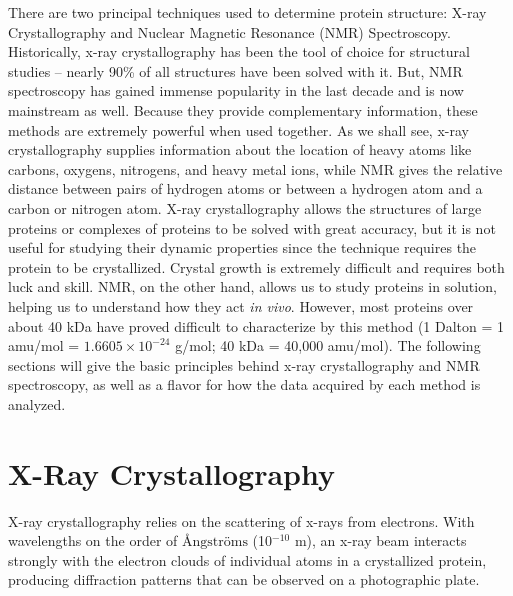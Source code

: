 There are two principal techniques used to determine protein structure: X-ray Crystallography and Nuclear Magnetic Resonance (NMR) Spectroscopy.  Historically, x-ray crystallography has been the tool of choice for structural studies -- nearly 90\% of all structures have been solved with it.  But, NMR spectroscopy has gained immense popularity in the last decade and is now mainstream as well.  Because they provide complementary information, these methods are extremely powerful when used together.  
As we shall see, x-ray crystallography supplies information about the location of heavy atoms like carbons, oxygens, nitrogens, and heavy metal ions, while NMR gives the relative distance between pairs of hydrogen atoms or between a hydrogen atom and a carbon or nitrogen atom.  X-ray crystallography allows the structures of large proteins or complexes of proteins to be solved with great accuracy, but it is not useful for studying their dynamic properties since the technique requires the protein to be crystallized.  Crystal growth is extremely difficult and requires both luck and skill.  NMR, on the other hand, allows us to study proteins in solution, helping us to understand how they act {\it in vivo}.  However, most proteins over about 40 kDa have proved difficult to characterize by this method (1 Dalton = 1 amu/mol = $1.6605\times10^{-24}$ g/mol; 40 kDa = 40,000 amu/mol).
The following sections will give the basic principles behind x-ray crystallography and NMR spectroscopy, as well as a flavor for how the data acquired by each method is analyzed.  

\section{X-Ray Crystallography}

X-ray crystallography relies on the scattering of x-rays from electrons.  With wavelengths on the order of $\text {\AA ngstr{\"o}ms}$ (10$^{-10}$ m), an x-ray beam interacts strongly with the electron clouds of individual atoms in a crystallized protein, producing diffraction patterns that can be observed on a photographic plate. 

